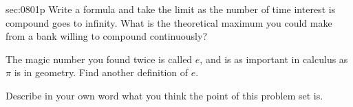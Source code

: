 \begin{multicols*}{2}
\begin{exercises}{sec:0801p}
\vspace{2cm}
\lab{} Write a formula and take the limit as the number of time interest is compound goes to infinity.  What is the theoretical maximum you could make from a bank willing to compound continuously?

\vspace{2cm}
\lab{} The magic number you found twice is called $e$, and is as important in calculus as $\pi$ is in geometry.  Find another definition of $e$.

\vspace{2cm}
\lab{} Describe in your own word what you think the point of this problem set is.

\end{exercises}
\end{multicols*}